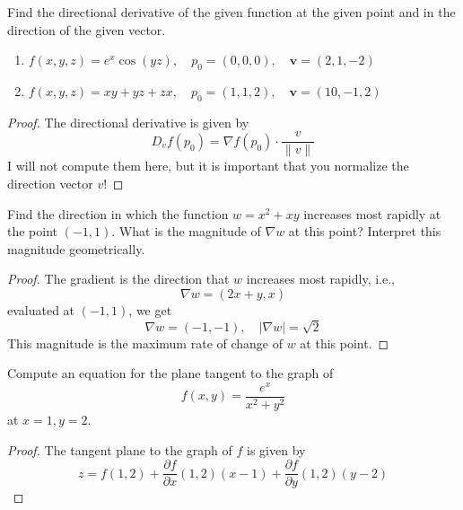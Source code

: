 \documentclass[openany]{book}
\begin{document}
\begin{prob}[26]
    Find the directional derivative of the given function at the given point and in the direction of the given vector.

    \begin{enumerate}
        \item[(a)] \( f(x, y, z) = e^x \cos(yz), \quad p_0 = (0, 0, 0), \quad \mathbf{v} = (2, 1, -2) \)
        \item[(b)] \( f(x, y, z) = xy + yz + zx, \quad p_0 = (1, 1, 2), \quad \mathbf{v} = (10, -1, 2) \)
    \end{enumerate}
\end{prob}
\begin{proof}
    The directional derivative is given by 
    \begin{equation*}
        D_vf(p_0)=\nabla f(p_0)\cdot\frac{v}{\|v\|}
    \end{equation*}
    I will not compute them here, but it is important that you normalize the direction vector $v$!
\end{proof}


\begin{prob}[30]
    Find the direction in which the function \( w = x^2 + xy \) increases most rapidly at the point \((-1, 1)\). What is the magnitude of \( \nabla w \) at this point? Interpret this magnitude geometrically.
\end{prob}
\begin{proof}
    The gradient is the direction that $w$ increases most rapidly, i.e., 
    \begin{equation*}
        \nabla w=(2x+y, x)
    \end{equation*}
    evaluated at $(-1,1)$, we get 
    \begin{equation*}
        \nabla w=(-1, -1), \quad |\nabla w|=\sqrt{2}
    \end{equation*}
    This magnitude is the maximum rate of change of $w$ at this point.
\end{proof}

\begin{prob}[40]
    Compute an equation for the plane tangent to the graph of
    \[
    f(x, y) = \frac{e^x}{x^2 + y^2}
    \]
    at \( x = 1, y = 2 \).
\end{prob}
\begin{proof}
    The tangent plane to the graph of $f$ is given by 
    \begin{equation*}
        z=f(1,2)+\frac{\partial f}{\partial x}(1,2)(x-1)+\frac{\partial f}{\partial y}(1,2)(y-2)
    \end{equation*}
\end{proof}
\end{document}
